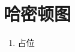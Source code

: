 \documentclass[../../main.tex]{subfiles}
\begin{document}
\section{哈密顿图}
\begin{enumerate}
    \item 占位
\end{enumerate}
\end{document}
